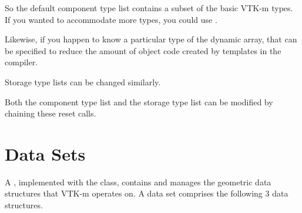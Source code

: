 So the default component type list contains a subset of the basic VTK-m
types. If you wanted to accommodate more types, you could use
.


Likewise, if you happen to know a particular type of the dynamic array,
that can be specified to reduce the amount of object code created by
templates in the compiler.


Storage type lists can be changed similarly.


Both the component type list and the storage type list can be modified by
chaining these reset calls.




\section{Data Sets}
\label{sec:DataSets}


A , implemented with the  class,
contains and manages the geometric data structures that VTK-m operates on.
A data set comprises the following 3 data structures.

